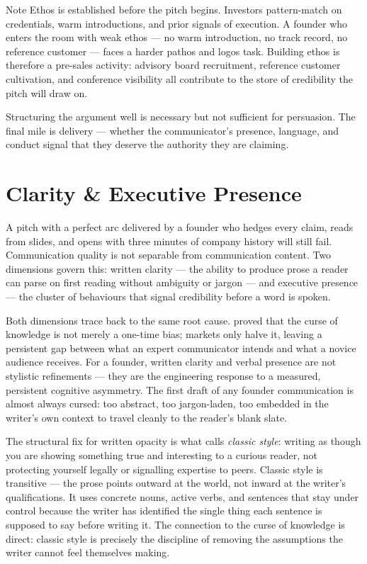 \begin{admonition}{Note}
Ethos is established before the pitch begins. Investors pattern-match on credentials, warm
introductions, and prior signals of execution. A founder who enters the room with weak
ethos — no warm introduction, no track record, no reference customer — faces a harder
pathos and logos task. Building ethos is therefore a pre-sales activity: advisory board
recruitment, reference customer cultivation, and conference visibility all contribute to
the store of credibility the pitch will draw on.
\end{admonition}

Structuring the argument well is necessary but not sufficient for persuasion. The final
mile is delivery — whether the communicator's presence, language, and conduct signal that
they deserve the authority they are claiming.

\section{Clarity \& Executive Presence}\label{sec:clarity-presence}

A pitch with a perfect arc delivered by a founder who hedges every claim, reads from
slides, and opens with three minutes of company history will still fail. Communication
quality is not separable from communication content. Two dimensions govern this: written
clarity — the ability to produce prose a reader can parse on first reading without
ambiguity or jargon — and executive presence — the cluster of behaviours that signal
credibility before a word is spoken.

Both dimensions trace back to the same root cause. \textcite{camerer1989curse} proved that
the curse of knowledge is not merely a one-time bias; markets only halve it, leaving a
persistent gap between what an expert communicator intends and what a novice audience
receives. %
For a founder, written clarity and verbal presence are not stylistic refinements — they
are the engineering response to a measured, persistent cognitive asymmetry. The first
draft of any founder communication is almost always cursed: too abstract, too jargon-laden,
too embedded in the writer's own context to travel cleanly to the reader's blank slate.

The structural fix for written opacity is what \textcite{pinker2014senseofstyle} calls
\emph{classic style}: writing as though you are showing something true and interesting to
a curious reader, not protecting yourself legally or signalling expertise to peers. Classic
style is transitive — the prose points outward at the world, not inward at the writer's
qualifications. It uses concrete nouns, active verbs, and sentences that stay under control
because the writer has identified the single thing each sentence is supposed to say before
writing it. The connection to the curse of knowledge is direct: classic style is precisely
the discipline of removing the assumptions the writer cannot feel themselves making.

